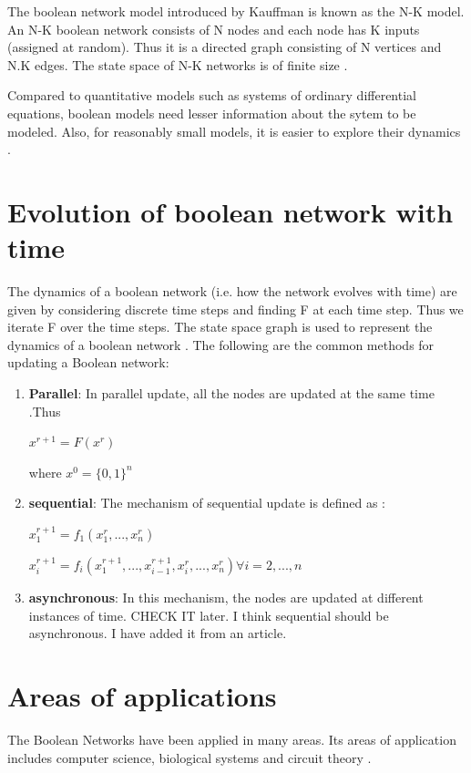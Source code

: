 \documentclass[11pt]{report}
\begin{document}
    The boolean network model introduced by Kauffman is known as the N-K model. An N-K boolean network consists of N nodes and each node has K inputs (assigned at random). Thus it is a directed
    graph consisting of N vertices and N.K edges. The state space of N-K networks is of finite size \cite{Greil2012}.
    
    Compared to quantitative models such as systems of ordinary differential equations, boolean models need lesser information about the sytem to be modeled. Also, for reasonably
    small models, it is easier to explore their dynamics \cite{Dimitrova2011}.
    \section{\color{red} Evolution of boolean network with time}
    The dynamics of a boolean network (i.e. how the network evolves with time) are given by considering discrete time steps and finding F at each time step.
    Thus we iterate F over the time steps. The state space graph is used to represent the dynamics of a boolean network \cite{Veliz-Cuba2011}.
    The following are the common methods for updating a Boolean network:
    \begin{enumerate}
     \item \textbf{Parallel}: In parallel update, all the nodes are updated at the same time \cite{Goles2010}.Thus
     \begin{center} $x^{r+1}=F(x^{r})$\end{center}
     where $x^{0}=\{0,1\}^{n}$
     \item \textbf{sequential}: The mechanism of sequential update is defined as \cite{Goles2010}:
     \begin{center}
      $x_{1}^{r+1}=f_{1}(x_{1}^{r},...,x_{n}^{r})$
     \end{center} 
     \begin{center}
      $x_{i}^{r+1}=f_{i}(x_{1}^{r+1},...,x_{i-1}^{r+1},x_{i}^{r},...,x_{n}^{r}) \forall i=2,...,n$
     \end{center}
     \item \textbf{asynchronous}: In this mechanism, the nodes are updated at different instances of time.
     {\color{red}CHECK IT later. I think sequential should be asynchronous. I have added it from an article.}
    \end{enumerate}

    \section{Areas of applications}
    The Boolean Networks have been applied in many areas.
    Its areas of application includes computer science, biological systems and circuit theory \cite{Goles2010}.
    
\end{document}
